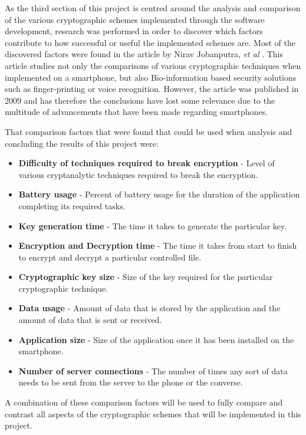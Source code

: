 \documentclass[a4paper,10pt]{report}
\begin{document}
As the third section of this project is centred around the analysis and comparison of the various cryptographic schemes implemented through the software development, research was performed in order to discover which factors contribute to how successful or useful the implemented schemes are. Most of the discovered factors were found in the article by Nirav Jobanputra, \textit{et al} \cite{ejeta}. This article studies not only the comparisons of various cryptographic techniques when implemented on a smartphone, but also Bio-information based security solutions such as finger-printing or voice recognition. However, the article was published in 2009 and has therefore the conclusions have lost some relevance due to the multitude of advancements that have been made regarding smartphones. 

That comparison factors that were found that could be used when analysis and concluding the results of this project were:

\begin{itemize}
 \item \textbf{Difficulty of techniques required to break encryption} - Level of various cryptanalytic techniques required to break the encryption. 
 \item \textbf{Battery usage} - Percent of battery usage for the duration of the application completing its required tasks. 
 \item \textbf{Key generation time} - The time it takes to generate the particular key.
 \item \textbf{Encryption and Decryption time} - The time it takes from start to finish to encrypt and decrypt a particular controlled file. 
 \item \textbf{Cryptographic key size} - Size of the key required for the particular cryptographic technique. 
 \item \textbf{Data usage} - Amount of data that is stored by the application and the amount of data that is sent or received. 
 \item \textbf{Application size} - Size of the application once it has been installed on the smartphone. 
 \item \textbf{Number of server connections} - The number of times any sort of data needs to be sent from the server to the phone or the converse.   
\end{itemize}

A combination of these comparison factors will be used to fully compare and contrast all aspects of the cryptographic schemes that will be implemented in this project. 
\end{document}

